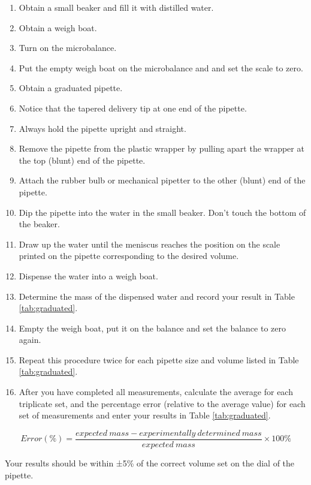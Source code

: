 \documentclass[]{book}
\providecommand{\tightlist}{%
  \setlength{\itemsep}{0pt}\setlength{\parskip}{0pt}}
\begin{document}
\begin{enumerate}
\def\labelenumi{\arabic{enumi}.}
\tightlist
\item
  Obtain a small beaker and fill it with distilled water.
\item
  Obtain a weigh boat.
\item
  Turn on the microbalance.
\item
  Put the empty weigh boat on the microbalance and and set the scale to zero.
\item
  Obtain a graduated pipette.
\item
  Notice that the tapered delivery tip at one end of the pipette.
\item
  Always hold the pipette upright and straight.
\item
  Remove the pipette from the plastic wrapper by pulling apart the wrapper at the top (blunt) end of the pipette.
\item
  Attach the rubber bulb or mechanical pipetter to the other (blunt) end of the pipette.
\item
  Dip the pipette into the water in the small beaker. Don't touch the bottom of the beaker.
\item
  Draw up the water until the meniscus reaches the position on the scale printed on the pipette corresponding to the desired volume.
\item
  Dispense the water into a weigh boat.
\item
  Determine the mass of the dispensed water and record your result in Table \ref{tab:graduated}.
\item
  Empty the weigh boat, put it on the balance and set the balance to zero again.
\item
  Repeat this procedure twice for each pipette size and volume listed in Table \ref{tab:graduated}.
\item
  After you have completed all measurements, calculate the average for each triplicate set, and the percentage error (relative to the average value) for each set of measurements and enter your results in Table \ref{tab:graduated}.
\end{enumerate}

\[ Error (\%) = \frac{expected\ mass - experimentally\ determined\ mass}{expected\ mass} \times 100\% \]

Your results should be within ±5\% of the correct volume set on the dial of the pipette.
\end{document}
